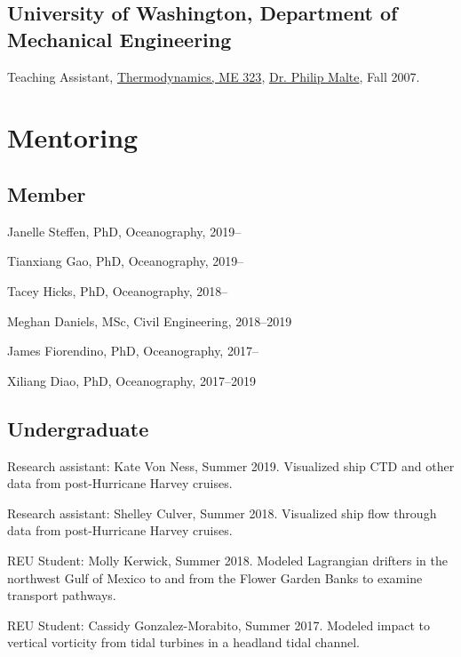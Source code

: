 \documentclass[10pt,letterpaper]{article}
\renewenvironment{itemize}{
  \begin{list}{}{
    \setlength{\leftmargin}{1.5em}
    \setlength{\itemsep}{0.25em}
    \setlength{\parskip}{0pt}
    \setlength{\parsep}{0.25em}
  }
}{
  \end{list}
}
\begin{document}
\subsection*{University of Washington, Department of Mechanical Engineering}

\begin{itemize}

\item Teaching Assistant,
  \href{http://www.washington.edu/students/crscat/meche.html#me323}{Thermodynamics, ME 323},
  \href{http://www.me.washington.edu/research/faculty/malte/}{Dr. Philip Malte},
  Fall 2007.

\end{itemize}



\section*{Mentoring}

\subsection*{Member}

\begin{itemize}
\item Janelle Steffen, PhD, Oceanography, 2019--
\item Tianxiang Gao, PhD, Oceanography, 2019--
\item Tacey Hicks, PhD, Oceanography, 2018--
\item Meghan Daniels, MSc, Civil Engineering, 2018--2019
\item James Fiorendino, PhD, Oceanography, 2017--
\item Xiliang Diao, PhD, Oceanography, 2017--2019
\end{itemize}

\subsection*{Undergraduate}

\begin{itemize}
\item Research assistant: Kate Von Ness, Summer 2019. Visualized ship CTD and other data from post-Hurricane Harvey cruises.
\item Research assistant: Shelley Culver, Summer 2018. Visualized ship flow through data from post-Hurricane Harvey cruises.
\item REU Student: Molly Kerwick, Summer 2018. Modeled Lagrangian drifters in the northwest Gulf of Mexico to and from the Flower Garden Banks to examine transport pathways.
\item REU Student: Cassidy Gonzalez-Morabito, Summer 2017. Modeled impact to vertical vorticity from tidal turbines in a headland tidal channel.
\end{itemize}
\end{document}
